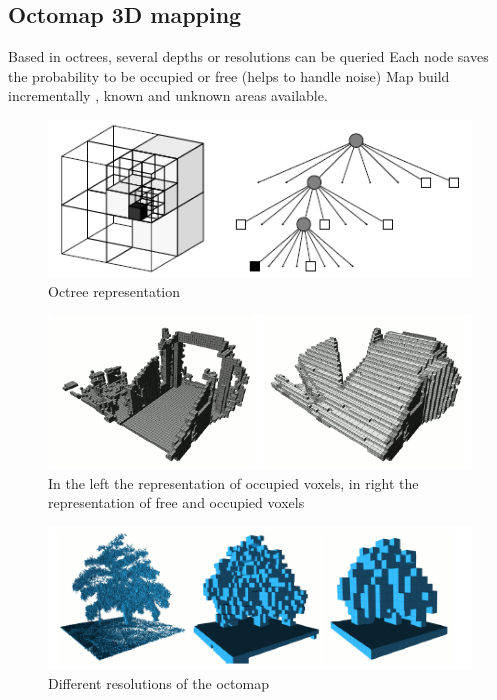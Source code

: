 \documentclass[fontsize=12pt]{article}
\begin{document}
\subsection{Octomap 3D mapping}
Based in octrees, several depths or resolutions can be queried
Each node saves the probability to be occupied or free (helps to handle noise)
Map build incrementally , known and unknown areas available.
\begin{figure}[H]
\begin{center}
\includegraphics[width=0.8\linewidth]{images/octree}
\caption{Octree representation}
\label{fig:octree}
\end{center}
\end{figure}

\begin{figure}[H]
\begin{center}
\includegraphics[width=0.8\linewidth]{images/octofree}
\caption{In the left the representation of occupied voxels, in right the representation of free and occupied voxels}
\label{fig:octreefree}
\end{center}
\end{figure}

\begin{figure}[H]
\begin{center}
\includegraphics[width=0.8\linewidth]{images/treedifres}
\caption{Different resolutions of the octomap}
\label{fig:difrefocto}
\end{center}
\end{figure}
\end{document}
